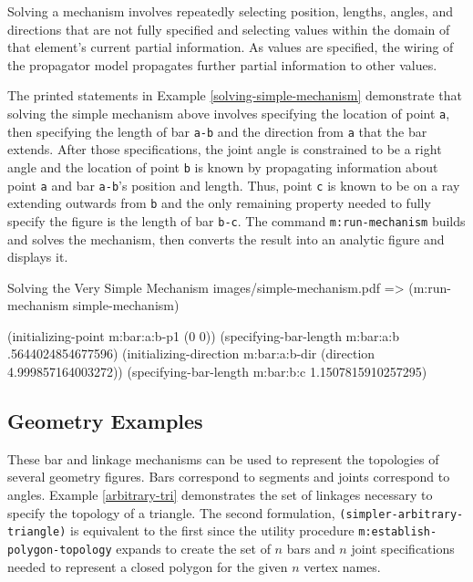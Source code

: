 Solving a mechanism involves repeatedly selecting position, lengths,
angles, and directions that are not fully specified and selecting
values within the domain of that element's current partial
information. As values are specified, the wiring of the propagator
model propagates further partial information to other values.

The printed statements in Example \ref{solving-simple-mechanism}
demonstrate that solving the simple mechanism above involves
specifying the location of point \texttt{a}, then specifying the
length of bar \texttt{a-b} and the direction from \texttt{a} that the
bar extends. After those specifications, the joint angle is
constrained to be a right angle and the location of point \texttt{b}
is known by propagating information about point \texttt{a} and bar
\texttt{a-b}'s position and length. Thus, point \texttt{c} is known to
be on a ray extending outwards from \texttt{b} and the only remaining
property needed to fully specify the figure is the length of bar
\texttt{b-c}. The command \texttt{m:run-mechanism} builds and solves
the mechanism, then converts the result into an analytic figure and
displays it.

\begin{pdf-example}
[label=solving-simple-mechanism]
{Solving the Very Simple Mechanism}
{images/simple-mechanism.pdf}
=> (m:run-mechanism simple-mechanism)

(initializing-point m:bar:a:b-p1 (0 0))
(specifying-bar-length m:bar:a:b .5644024854677596)
(initializing-direction m:bar:a:b-dir (direction 4.999857164003272))
(specifying-bar-length m:bar:b:c 1.1507815910257295)
\end{pdf-example}

\subsection{Geometry Examples}

These bar and linkage mechanisms can be used to represent the
topologies of several geometry figures. Bars correspond to segments
and joints correspond to angles. Example \ref{arbitrary-tri}
demonstrates the set of linkages necessary to specify the topology of
a triangle. The second formulation,
\texttt{(simpler-arbitrary-triangle)} is equivalent to the first since
the utility procedure \texttt{m:establish-polygon-topology} expands to
create the set of $n$ bars and $n$ joint specifications needed to
represent a closed polygon for the given $n$ vertex names.


